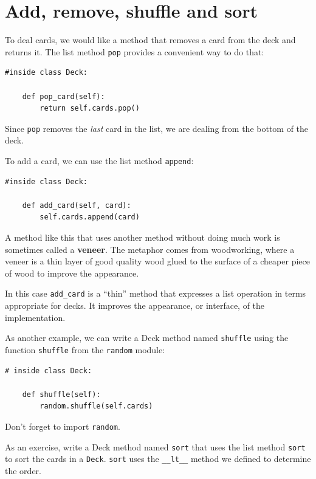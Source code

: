 \documentclass[10pt]{book}
\begin{document}
\section{Add, remove, shuffle and sort}

To deal cards, we would like a method that
removes a card from the deck and returns it.
The list method {\tt pop} provides a convenient way to do that:

\begin{verbatim}
#inside class Deck:

    def pop_card(self):
        return self.cards.pop()
\end{verbatim}
%
Since {\tt pop} removes the {\em last} card in the list, we are
dealing from the bottom of the deck.

To add a card, we can use the list method {\tt append}:

\begin{verbatim}
#inside class Deck:

    def add_card(self, card):
        self.cards.append(card)
\end{verbatim}
%
A method like this that uses another method without doing
much work is sometimes called a {\bf veneer}.  The metaphor
comes from woodworking, where a veneer is a thin
layer of good quality wood glued to the surface of a cheaper piece of
wood to improve the appearance.

In this case \verb"add_card" is a ``thin'' method that expresses
a list operation in terms appropriate for decks.  It
improves the appearance, or interface, of the
implementation.

As another example, we can write a Deck method named {\tt shuffle}
using the function {\tt shuffle} from the {\tt random} module:

\begin{verbatim}
# inside class Deck:

    def shuffle(self):
        random.shuffle(self.cards)
\end{verbatim}
%
Don't forget to import {\tt random}.

As an exercise, write a Deck method named {\tt sort} that uses the
list method {\tt sort} to sort the cards in a {\tt Deck}.  {\tt sort}
uses the \verb"__lt__" method we defined to determine the order.
 
\end{document}
